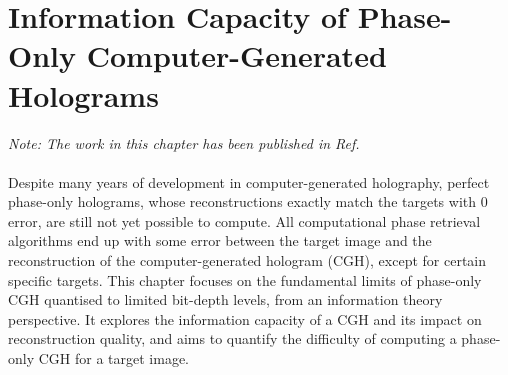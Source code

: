 \chapter{Information Capacity of Phase-Only Computer-Generated Holograms}
\label{chapter:information capacity}

\graphicspath{{Chapter_Information_capacity/Figs/}}

\textit{Note: The work in this chapter has been published in Ref. \cite{Sha2024}}\\\\

Despite many years of development in computer-generated holography, perfect phase-only holograms, whose reconstructions exactly match the targets with 0 error, are still not yet possible to compute. All computational phase retrieval algorithms end up with some error between the target image and the reconstruction of the computer-generated hologram (CGH), except for certain specific targets. This chapter focuses on the fundamental limits of phase-only CGH quantised to limited bit-depth levels, from an information theory perspective. It explores the information capacity of a CGH and its impact on reconstruction quality, and aims to quantify the difficulty of computing a phase-only CGH for a target image.



